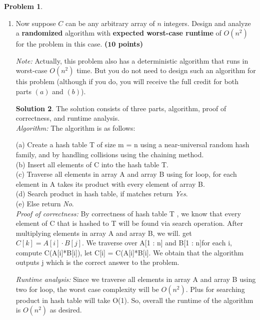 \documentclass{article}
\theoremstyle{definition}
\newtheorem{problem}{Problem}
\newtheorem*{solution*}{Solution}
\newenvironment{solution}{\begin{solution*}}{{} \end{solution*}}
\newcommand{\grade}[1]{\hfill{\textbf{($\mathbf{#1}$ points)}}}
\begin{document}
\begin{problem}
\begin{enumerate}[label=$(\alph*)$]
\begin{solution}
	\emph{Runtime analysis:} Since we traverse all elements in array A and array B using two for loop, the worst case complexity will be $O(n^2)$. Plus for searching product in hash table will take O(1). So, overall the runtime of the 	algorithm is $O(n^2)$ as desired.
	
	\end{solution}
	
	
	\newpage
	\item Now suppose $C$ can be any arbitrary array of $n$ integers. Design and analyze a \textbf{randomized} algorithm with \textbf{expected worst-case runtime} of $O(n^2)$ for the problem in this case. \grade{10} 

	\medskip
	\emph{Note:} Actually, this problem also has a deterministic algorithm that runs in worst-case $O(n^2)$ time. But you do not need to design such an algorithm for this problem (although if you do, you will receive the full credit for both parts $(a)$ and $(b)$).
	
	\bigskip	
	\begin{solution} The solution consists of three parts, algorithm, proof of correctness, and runtime analysis. \\
	
	\emph{Algorithm:} The algorithm is as follows: 
	
	(a) Create a hash table T of size m = n using a near-universal random hash family, and by handling collisions using the chaining method. \\
	(b) Insert all elements of C into the hash table T. \\
	(c) Traverse all elements in array A and array B using for loop, for each element in A takes its product with every element of array B. \\
	(d) Search product in hash table, if matches return \emph{Yes}. \\
	(e) Else return \emph{No}. \\
	
	\emph{Proof of correctness:} By correctness of hash table T , we know that every element of C that is hashed to T will be found via search operation. After multiplying elements in array A and array B, we will. get $C[k] = A[i] \cdot B[j]$. We traverse over A[1 : n] and B[1 : n]for each i, compute 	C(A[i]*B[i]), let C[i] = C(A[i]*B[i]. We obtain that the algorithm outputs j which is the correct answer to the problem.
	
	\emph{Runtime analysis:} Since we traverse all elements in array A and array B using two for loop, the worst case complexity will be $O(n^2)$. Plus for searching product in hash table will take O(1). So, overall the runtime of the 	algorithm is $O(n^2)$ as desired.

	
	
	\end{solution}
	
	
	\end{enumerate}
	
	
\end{problem}
\end{document}
